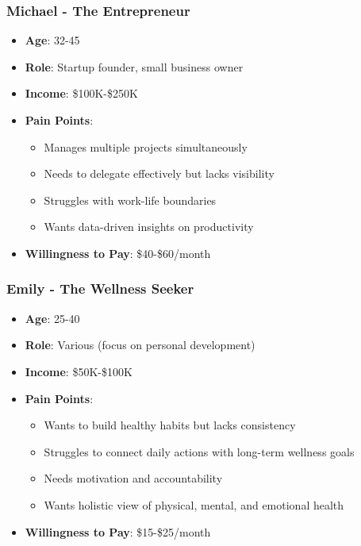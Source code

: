 \subsubsection{Michael - The Entrepreneur}

\begin{itemize}
    \item \textbf{Age}: 32-45
    \item \textbf{Role}: Startup founder, small business owner
    \item \textbf{Income}: \$100K-\$250K
    \item \textbf{Pain Points}:
    \begin{itemize}
        \item Manages multiple projects simultaneously
        \item Needs to delegate effectively but lacks visibility
        \item Struggles with work-life boundaries
        \item Wants data-driven insights on productivity
    \end{itemize}
    \item \textbf{Willingness to Pay}: \$40-\$60/month
\end{itemize}

\subsubsection{Emily - The Wellness Seeker}

\begin{itemize}
    \item \textbf{Age}: 25-40
    \item \textbf{Role}: Various (focus on personal development)
    \item \textbf{Income}: \$50K-\$100K
    \item \textbf{Pain Points}:
    \begin{itemize}
        \item Wants to build healthy habits but lacks consistency
        \item Struggles to connect daily actions with long-term wellness goals
        \item Needs motivation and accountability
        \item Wants holistic view of physical, mental, and emotional health
    \end{itemize}
    \item \textbf{Willingness to Pay}: \$15-\$25/month
\end{itemize}

